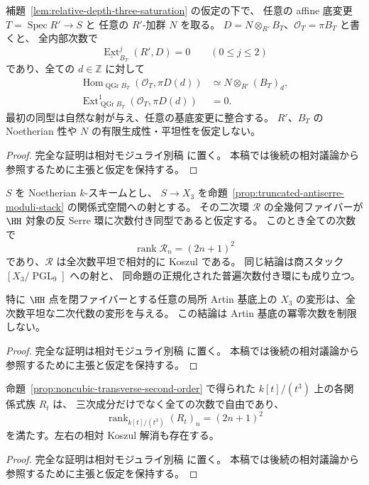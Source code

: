 \begin{corollary}[任意の係数加群に対する切断と一次コホモロジー]
\label{cor:relative-depth-three-coefficients}
補題~\ref{lem:relative-depth-three-saturation} の仮定の下で、
任意の affine 底変更 $T=\operatorname{Spec}R'\to S$ と
任意の $R'$-加群 $N$ を取る。
$D=N\otimes_{R'}B_T$、$\mathcal O_T=\pi B_T$ と書くと、
全内部次数で
\[
 \underline{\operatorname{Ext}}_{B_T}^{j}(R',D)=0
 \qquad(0\le j\le2)
\]
であり、全ての $d\in\mathbb Z$ に対して
\begin{align*}
 \operatorname{Hom}_{\operatorname{QGr}B_T}
    (\mathcal O_T,\pi D(d))
       &\simeq N\otimes_{R'}(B_T)_d,\\
 \operatorname{Ext}^{1}_{\operatorname{QGr}B_T}
    (\mathcal O_T,\pi D(d))&=0.
\end{align*}
最初の同型は自然な射が与え、任意の基底変更に整合する。
$R'$、$B_T$ の Noetherian 性や $N$ の有限生成性・平坦性を仮定しない。
\end{corollary}
\begin{proof}
完全な証明は相対モジュライ別稿
\cite[相対Koszul・Noetherian基底変更・tailsの節]{QuadricModuli2026} に置く。
本稿では後続の相対議論から参照するために主張と仮定を保持する。
\end{proof}

\begin{corollary}
\label{cor:h2-geometric-family-koszul}
$S$ を Noetherian $k$-スキームとし、
$S\to X_3$ を命題~\ref{prop:truncated-antiserre-moduli-stack}
の関係式空間への射とする。
その二次環 $\mathcal R$ の全幾何ファイバーが
$\HH$ 対象の反 Serre 環に次数付き同型であると仮定する。
このとき全ての次数で
\[
 \operatorname{rank}\mathcal R_n=(2n+1)^2
\]
であり、$\mathcal R$ は全次数平坦で相対的に Koszul である。
同じ結論は商スタック $[X_3/\operatorname{PGL}_9]$ への射と、
同命題の正規化された普遍次数付き環にも成り立つ。

特に $\HH$ 点を閉ファイバーとする任意の局所 Artin 基底上の
$X_3$ の変形は、全次数平坦な二次代数の変形を与える。
この結論は Artin 基底の冪零次数を制限しない。
\end{corollary}
\begin{proof}
完全な証明は相対モジュライ別稿
\cite[相対Koszul・Noetherian基底変更・tailsの節]{QuadricModuli2026} に置く。
本稿では後続の相対議論から参照するために主張と仮定を保持する。
\end{proof}

\begin{corollary}
\label{cor:noncubic-second-order-all-degrees}
命題~\ref{prop:noncubic-transverse-second-order} で得られた
$k[t]/(t^3)$ 上の各関係式族 $R_t$ は、
三次成分だけでなく全ての次数で自由であり、
\[
 \operatorname{rank}_{k[t]/(t^3)}(R_t)_n=(2n+1)^2
\]
を満たす。左右の相対 Koszul 解消も存在する。
\end{corollary}
\begin{proof}
完全な証明は相対モジュライ別稿
\cite[相対Koszul・Noetherian基底変更・tailsの節]{QuadricModuli2026} に置く。
本稿では後続の相対議論から参照するために主張と仮定を保持する。
\end{proof}

